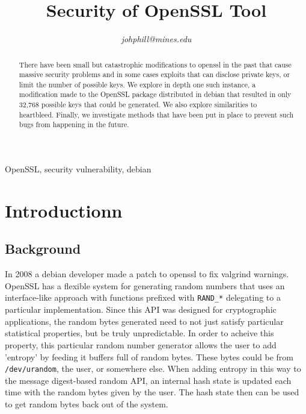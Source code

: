 \documentclass[conference]{IEEEtran}
\begin{document}
\title{Security of OpenSSL Tool}

\author{
\textit{johphill@mines.edu}\\
\and
{}
\and
{}
\and
{}
\and
{}
\and
{}
\and
{}
}

\maketitle

\begin{abstract}
There have been small but catastrophic modifications to openssl in the
past\cite{1}\cite{2}\cite{5} that cause massive security problems and
in some cases exploits that can disclose private keys, or limit the
number of possible keys. We explore in depth one such instance, a
modification made to the OpenSSL package distributed in debian that
resulted in only 32,768 possible keys that could be generated. We also
explore similarities to heartbleed. Finally, we investigate methods
that have been put in place to prevent such bugs from happening in the
future.
\end{abstract}

\begin{IEEEkeywords}
OpenSSL, security vulnerability, debian
\end{IEEEkeywords}

\section{Introductionn}
\subsection{Background}
In 2008 a debian developer made a patch to openssl to fix valgrind
warnings\cite{2}\cite{3}. OpenSSL has a flexible system for generating
random numbers that uses an interface-like approach with functions
prefixed with \verb|RAND_*| delegating to a particular
implementation. Since this API was designed for cryptographic
applications, the random bytes generated need to not just satisfy
particular statistical properties, but be truly unpredictable. In order
to acheive this property, this particular random number generator
allows the user to add 'entropy' by feeding it buffers full of random
bytes. These bytes could be from \verb|/dev/urandom|, the user, or
somewhere else. When adding entropy in this way to the message
digest-based random API, an internal hash state is updated each time
with the random bytes given by the user. The hash state then can be
used to get random bytes back out of the system. 
\end{document}
